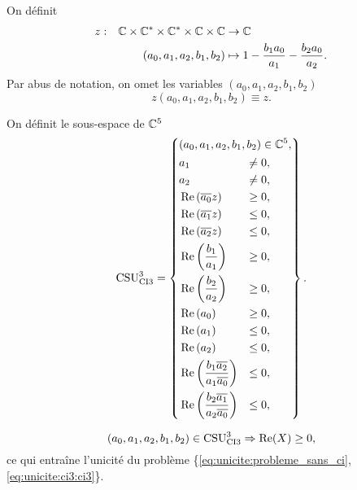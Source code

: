     On définit 
    \begin{equation}
      \label{eq:fonction:z-ci3}
      \fonction{z}{\CC\times\CC^*\times\CC^*\times \CC \times \CC}{\CC}%
        {(a_0,a_1,a_2,b_1,b_2)}{1 - \frac{b_1a_0}{a_1} - \frac{b_2a_0}{a_2}.}
    \end{equation}
    Par abus de notation, on omet les variables \( (a_0,a_1,a_2,b_1,b_2)\)
    \begin{equation}
       z(a_0,a_1,a_2,b_1,b_2) \equiv z.
    \end{equation}
  \begin{defn}
    \label{def:csu:ci3-3}

    On définit le sous-espace  de \(\CC^5\)
    \begin{equation*}
      \CSU[3]{CI3} = \left\lbrace
      \begin{aligned}
        &(a_0,a_1,a_2,b_1,b_2) \in \CC^5,
        \\
        &\begin{aligned}
          &a_1 &\not = 0,
          \\
          &a_2 &\not = 0,
          \\
          &\Re\left(\conj{a_0}z\right) &\ge 0,
          \\
          &\Re\left(\conj{a_1}z\right) &\le 0,
          \\
          &\Re\left(\conj{a_2}z\right) &\le 0,
          \\
          &\Re\left(\frac{b_1}{a_1}\right) &\ge 0,
          \\
          &\Re\left(\frac{b_2}{a_2}\right) &\ge 0,
          \\
          &\Re\left(a_0\right) &\ge 0,
          \\
          &\Re\left(a_1\right) &\le 0,
          \\
          &\Re\left(a_2\right) &\le 0,
          \\
          &\Re\left(\frac{b_1\conj{a_2}}{a_1\conj{a_0}}\right) &\le 0,
          \\
          &\Re\left(\frac{b_2\conj{a_1}}{a_2\conj{a_0}}\right) &\le 0,
        \end{aligned}
      \end{aligned}
      \right\rbrace.
    \end{equation*}
  \end{defn}

  
  \begin{prop}
    \label{prop:csu:ci3-3}
    \begin{equation*}
      (a_0,a_1,a_2,b_1,b_2) \in \CSU[3]{CI3} \Rightarrow \Re(X) \ge 0,
    \end{equation*}
    ce qui entraîne l'unicité du problème \{\eqref{eq:unicite:probleme_sans_ci},\eqref{eq:unicite:ci3:ci3}\}.
  \end{prop}

